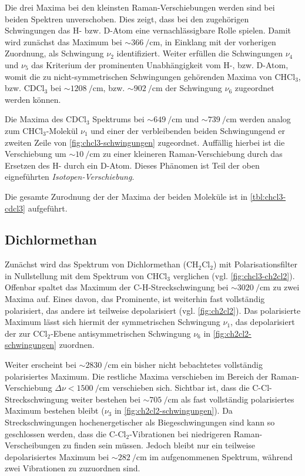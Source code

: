 \documentclass[../bericht.tex]{subfiles}
\begin{document}
        Die drei Maxima bei den kleinsten Raman-Verschiebungen werden sind bei beiden Spektren unverschoben. Dies zeigt, dass bei den zugehörigen Schwingungen das H- bzw. D-Atom eine vernachlässigbare Rolle spielen. Damit wird zunächst das Maximum bei $\sim\SI{366}{\per\centi\meter}$, in Einklang mit der vorherigen Zuordnung, als Schwingung $\nu_2$ identifiziert. Weiter erfüllen die Schwingungen $\nu_4$ und $\nu_5$ das Kriterium der prominenten Unabhängigkeit vom H-, bzw. D-Atom, womit die zu nicht-symmetrischen Schwingungen gehörenden Maxima von $\mathrm{CHCl_3}$, bzw. $\mathrm{CDCl_3}$ bei $\sim\SI{1208}{\per\centi\meter}$, bzw. $\sim\SI{902}{\per\centi\meter}$ der Schwingung $\nu_6$ zugeordnet werden können.

        Die Maxima des $\mathrm{CDCl_3}$ Spektrums bei $\sim\SI{649}{\per\centi\meter}$ und $\sim \SI{739}{\per\centi\meter}$ werden analog zum $\mathrm{CHCl_3}$-Molekül $\nu_1$ und einer der verbleibenden beiden Schwingungend er zweiten Zeile von \cref{fig:chcl3-schwingungen} zugeordnet. Auffällig hierbei ist die Verschiebung um $\sim\SI{10}{\per\centi\meter}$ zu einer kleineren Raman-Verschiebung durch das Ersetzen des H- durch ein D-Atom. Dieses Phänomen ist Teil der oben eigneführten \textit{Isotopen-Verschiebung}.
        \medskip

        Die gesamte Zurodnung der der Maxima der beiden Moleküle ist in \cref{tbl:chcl3-cdcl3} aufgeführt.


      \subsection{Dichlormethan}

        Zunächst wird das Spektrum von Dichlormethan ($\mathrm{CH_2Cl_2}$) mit Polarisationsfilter in Nullstellung mit dem Spektrum von $\mathrm{CHCl_3}$ verglichen (vgl. \cref{fig:chcl3-ch2cl2}). Offenbar spaltet das Maximum der C-H-Streckschwingung bei $\sim\SI{3020}{\per\centi\meter}$ zu zwei Maxima auf. Eines davon, das Prominente, ist weiterhin fast vollständig polarisiert, das andere ist teilweise depolarisiert (vgl. \cref{fig:ch2cl2}). Das polarisierte Maximum lässt sich hiermit der symmetrischen Schwingung $\nu_1$, das depolarisiert der zur $\mathrm{CCl_2}$-Ebene antisymmetrischen Schwingung $\nu_6$ in \cref{fig:ch2cl2-schwingungen} zuordnen.

        Weiter erscheint bei $\sim\SI{2830}{\per\centi\meter}$ ein bisher nicht bebachtetes vollständig polarisiertes Maximum. Die restliche Maxima verschieben im Bereich der Raman-Verschiebung $\Delta \nu < \SI{1500}{\per\centi\meter}$ verschieben sich. Sichtbar ist, dass die C-Cl-Streckschwingung weiter bestehen bei $\sim\SI{705}{\per\centi\meter}$ als fast vollständig polarisiertes Maximum bestehen bleibt ($\nu_3$ in \cref{fig:ch2cl2-schwingungen}). Da Streckschwingungen hochenergetischer als Biegeschwingungen sind kann so geschlossen werden, dass die C-$\mathrm{Cl_2}$-Vibrationen bei niedrigeren Raman-Verscheibungen zu finden sein müssen. Jedoch bleibt nur ein teilweise depolarisiertes Maximum bei $\sim\SI{282}{\per\centi\meter}$ im aufgenommenen Spektrum, während zwei Vibrationen zu zuzuordnen sind.
\end{document}
